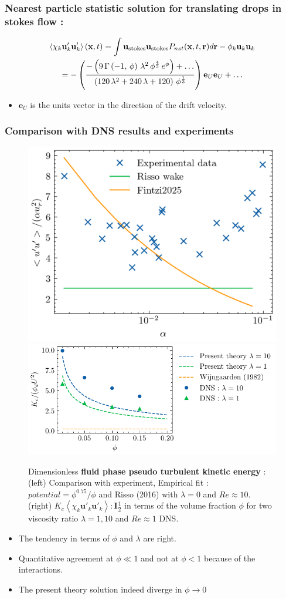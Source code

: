 \documentclass{sintefbeamer}
\newcommand{\avg}[1]{\left<#1\right>}
\begin{document}
\begin{frame}
  \frametitle{Nearest particle statistic solution for translating drops in stokes flow :}
  \begin{multline}
    \avg{\chi_k \textbf{u}'_k\textbf{u}'_k}(\textbf{x},t)
    = 
    {\int \textbf{u}_\text{stokes} \textbf{u}_\text{stokes}  P_{nst}(\textbf{x},t,\textbf{r}) d\textbf{r} }
    - \phi_k \textbf{u}_k\textbf{u}_k
    \\=
-\left({{-\left(9\,\Gamma\left(-1 , \,\phi\right)\,\lambda^2\,\phi
^{{{4}\over{3}}}\,e^{\phi}\right)+\ldots}\over{\left(120\,\lambda^2+240\,\lambda+
120\right)\,\phi^{{{1}\over{3}}}}}\right)
\textbf{e}_U\textbf{e}_U + \ldots
\end{multline}
\begin{itemize}
  \item $\textbf{e}_U$ is the units vector in the direction of the drift velocity. 
\end{itemize}

\end{frame}

\begin{frame}
  \frametitle{Comparison with DNS results and experiments}
  \begin{figure}[h!]
    \centering    
    \includegraphics[height = 0.25\textwidth]{image/upupexp.png}
    \includegraphics[height = 0.25\textwidth]{image/HOMOGENEOUS/fCA/Pseudo_turbe.pdf}
    \caption{
       Dimensionless \textbf{fluid phase pseudo turbulent kinetic energy} :
       (left) Comparison with experiment, Empirical fit : $\textit{potential} = \phi^{0.75}/\phi$ and Risso (2016) with $\lambda =0$ and $Re \approx 10$. 
       (right) $K_c \avg{\chi_k \textbf{u}'_k\textbf{u}'_k} : \textbf{I} \frac{1}{2}$ in terms of the volume fraction $\phi$ for two viscosity ratio $\lambda =1,10$ and $Re \approx 1$ DNS. 
    }
    \label{fig:Cp}
\end{figure}  
\begin{itemize}
  \item The tendency in terms of $\phi$ and $\lambda$ are right.  
  \item Quantitative agreement at $\phi \ll 1$ and not at $\phi <1$ because of the interactions.  
  \item The present theory solution indeed diverge in $\phi \to 0$ 
\end{itemize}
\end{frame}
\end{document}

